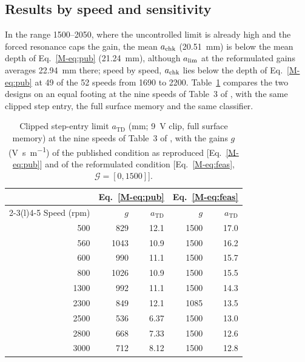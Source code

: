 \subsection{Results by speed and sensitivity}\label{supp:feas-res}

In the range 1500--\SI{2050}{\rpm}, where the uncontrolled limit is already high and the forced resonance caps the gain, the mean $a_{\mathrm{chk}}$ (\SI{20.51}{\milli\metre}) is below the mean depth of Eq.~\eqref{M-eq:pub} (\SI{21.24}{\milli\metre}), although $a_{\lim}$ at the reformulated gains averages \SI{22.94}{\milli\metre} there; speed by speed, $a_{\mathrm{chk}}$ lies below the depth of Eq.~\eqref{M-eq:pub} at 49 of the 52 speeds from 1690 to \SI{2200}{\rpm}. Table~\ref{tab:supp-feas-table3} compares the two designs on an equal footing at the nine speeds of Table~3 of \citet{ozsoy2026robust}, with the same clipped step entry, the full surface memory and the same classifier.

\begin{table}[!tbp]
  \centering
  \caption{Clipped step-entry limit $a_{\mathrm{TD}}$ (\si{\milli\metre}; \SI{9}{\volt} clip, full surface memory) at the nine speeds of Table~3 of \citet{ozsoy2026robust}, with the gains $g$ (\si{\volt\second\per\metre}) of the published condition as reproduced [Eq.~\eqref{M-eq:pub}] and of the reformulated condition [Eq.~\eqref{M-eq:feas}, $\mathcal G=[0,1500]$].}
  \label{tab:supp-feas-table3}
  \begin{tabular}{@{}rrrrr@{}}
    \toprule
    & \multicolumn{2}{c}{Eq.~\eqref{M-eq:pub}} & \multicolumn{2}{c}{Eq.~\eqref{M-eq:feas}}\\
    \cmidrule(lr){2-3}\cmidrule(l){4-5}
    Speed (rpm) & $g$ & $a_{\mathrm{TD}}$ & $g$ & $a_{\mathrm{TD}}$\\
    \midrule
    500  & 829  & 12.1 & 1500 & 17.0\\
    560  & 1043 & 10.9 & 1500 & 16.2\\
    600  & 990  & 11.1 & 1500 & 15.7\\
    800  & 1026 & 10.9 & 1500 & 15.5\\
    1300 & 992  & 11.1 & 1500 & 14.3\\
    2300 & 849  & 12.1 & 1085 & 13.5\\
    2500 & 536  & 6.37 & 1500 & 13.0\\
    2800 & 668  & 7.33 & 1500 & 12.6\\
    3000 & 712  & 8.12 & 1500 & 12.8\\
    \bottomrule
  \end{tabular}
\end{table}

